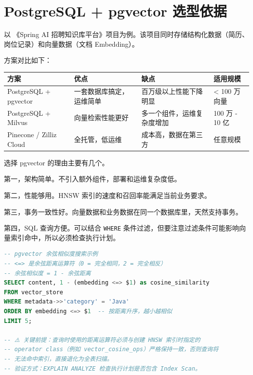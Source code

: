 \documentclass[9pt,a4paper,twocolumn]{ctexart}
\begin{document}
\section*{PostgreSQL + pgvector 选型依据}


以 《Spring AI 招聘知识库平台》项目为例。该项目同时存储结构化数据（简历、岗位记录）和向量数据（文档 Embedding）。



方案对比如下：


{\footnotesize
\begin{tabular}{|p{}|p{}|p{}|p{}|}
\hline
\textbf{方案} & \textbf{优点} & \textbf{缺点} & \textbf{适用规模} \\
\hline
PostgreSQL + pgvector & 一套数据库搞定，运维简单 & 百万级以上性能下降明显 & < 100 万向量 \\
\hline
PostgreSQL + Milvus & 向量检索性能更好 & 多一个组件，运维复杂度增加 & 100 万 - 10 亿 \\
\hline
Pinecone / Zilliz Cloud & 全托管，低运维 & 成本高，数据在第三方 & 任意规模 \\
\hline
\end{tabular}
}



选择 pgvector 的理由主要有几个。



第一，架构简单。不引入额外组件，部署和运维复杂度低。



第二，性能够用。HNSW 索引的速度和召回率能满足当前业务要求。



第三，事务一致性好。向量数据和业务数据在同一个数据库里，天然支持事务。



第四，SQL 查询方便。可以结合 \texttt{WHERE} 条件过滤，但要注意过滤条件可能影响向量索引命中，所以必须检查执行计划。



\begin{lstlisting}[language=SQL]
-- pgvector 余弦相似度搜索示例
-- <=> 是余弦距离运算符（0 = 完全相同，2 = 完全相反）
-- 余弦相似度 = 1 - 余弦距离
SELECT content, 1 - (embedding <=> $1) as cosine_similarity
FROM vector_store
WHERE metadata->>'category' = 'Java'
ORDER BY embedding <=> $1  -- 按距离升序，越小越相似
LIMIT 5;

-- ⚠️ 关键前提：查询时使用的距离运算符必须与创建 HNSW 索引时指定的
-- operator class（例如 vector_cosine_ops）严格保持一致，否则查询将
-- 无法命中索引，直接退化为全表扫描。
-- 验证方式：EXPLAIN ANALYZE 检查执行计划是否包含 Index Scan。
\end{lstlisting}
\end{document}
